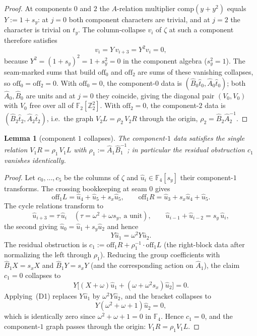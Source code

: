 \documentclass[11pt]{article}
\newcommand{\Z}{\mathbb{Z}}
\newcommand{\F}[1]{\mathbb{F}_{#1}}
\newcommand{\hA}{\hat{A}}
\newcommand{\hB}{\hat{B}}
\theoremstyle{plain}
\newtheorem{lemma}{Lemma}[section]
\theoremstyle{definition}
\theoremstyle{remark}
\begin{document}
\begin{proof}
At components $0$ and $2$ the $A$-relation multiplier $\mathrm{comp}(y+y^2)$ equals
$Y:=1+s_y$: at $j=0$ both component characters are trivial, and at $j=2$ the
character is trivial on $t_y$. The column-collapse $v_i$ of $\zeta$ at such a
component therefore satisfies
\[
  v_i=Y\,v_{i+3}=Y^2 v_i=0,
\]
because $Y^2=(1+s_y)^2=1+s_y^2=0$ in the component algebra ($s_y^2=1$). The
seam-marked sums that build $\mathrm{off}_0$ and $\mathrm{off}_2$ are sums of these
vanishing collapses, so $\mathrm{off}_0=\mathrm{off}_2=0$. With
$\mathrm{off}_0=0$, the component-$0$ data is $(\hB_0\hat t_0,\hA_0\hat t_0)$; both
$\hA_0,\hB_0$ are units and at $j=0$ they coincide, giving the diagonal pair
$(V_0,V_0)$ with $V_0$ free over all of $\F2[\Z_2^2]$. With $\mathrm{off}_2=0$, the
component-$2$ data is $(\hB_2\hat t_2,\hA_2\hat t_2)$, i.e.\ the graph
$V_2L=\rho_2\,V_2R$ through the origin, $\rho_2=\hB_2\hA_2^{-1}$.
\end{proof}

\begin{lemma}[component $1$ collapses]\label{lem:c1zero}
The component-$1$ data satisfies the single relation $V_1R=\rho_1\,V_1L$ with
$\rho_1:=\hA_1\hB_1^{-1}$; in particular the residual obstruction $c_1$ vanishes
identically.
\end{lemma}

\begin{proof}
Let $c_0,\dots,c_5$ be the columns of $\zeta$ and $\hat u_i\in\F4[s_y]$ their
component-$1$ transforms. The crossing bookkeeping at seam $0$ gives
\[
  \mathrm{off}_1L=\hat u_4+\hat u_5+s_x\hat u_5,\qquad
  \mathrm{off}_1R=\hat u_3+s_x\hat u_4+\hat u_5 .
\]
The cycle relations transform to
\[
  \hat u_{i+3}=\tau\,\hat u_i\quad(\tau=\omega^2+\omega s_y,\ \text{a unit}),
  \qquad \hat u_{i-1}+\hat u_{i-2}=s_y\,\hat u_i,
\]
the second giving $\hat u_0=\hat u_1+s_y\hat u_2$ and hence
\begin{equation}\label{eq:D1}
  Y\hat u_1=\omega^2 Y\hat u_2.\tag{D1}
\end{equation}
The residual obstruction is
$c_1:=\mathrm{off}_1R+\rho_1^{-1}\!\cdot\!\mathrm{off}_1L$ (the right-block data
after normalizing the left through $\rho_1$). Reducing the group coefficients with
$\hB_1 X=s_x X$ and $\hB_1 Y=s_x Y$ (and the corresponding action on $\hA_1$), the
claim $c_1=0$ collapses to
\[
  Y\bigl[(X+\omega)\hat u_1+(\omega+\omega^2 s_x)\hat u_2\bigr]=0 .
\]
Applying~(D1) replaces $Y\hat u_1$ by $\omega^2 Y\hat u_2$, and the bracket
collapses to
\[
  Y(\omega^2+\omega+1)\hat u_2=0,
\]
which is identically zero since $\omega^2+\omega+1=0$ in $\F4$. Hence $c_1=0$, and
the component-$1$ graph passes through the origin: $V_1R=\rho_1 V_1L$.
\end{proof}
\end{document}
